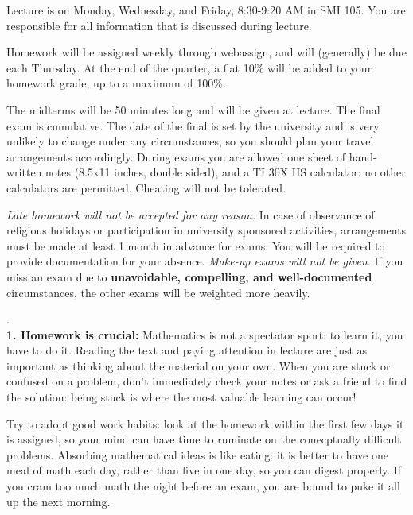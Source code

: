\documentclass[11 pt]{report}
\begin{document}
\vspace{0.25cm}

  Lecture is on Monday, Wednesday, and Friday, 8:30-9:20 AM in SMI 105.  You
are responsible for all information that is discussed
during lecture. 
\vspace{0.25cm}

  Homework will be assigned weekly through webassign, and will (generally) be due each Thursday. At the end of the quarter, a flat 10\% will be added to your homework grade, up to a maximum of 100\%. 
\vspace{0.25cm}


  The midterms will be 50 minutes long and
will be given at lecture.  The final exam is cumulative. The date of the final is set by the university and is very unlikely to change under any circumstances, so you should plan your travel arrangements accordingly. During exams you are allowed one 
sheet of hand-written notes (8.5x11 inches, double sided), and a TI 30X IIS calculator: no other calculators are permitted. 
Cheating will not be tolerated. 

\vspace{.25cm}

  \emph{Late homework will not be accepted
for any reason.}  In case of observance of religious holidays or
participation in university sponsored activities, arrangements must
be made at least 1 month in advance for exams. You will be required
to provide documentation for your absence. \emph{Make-up exams will
not be given}.  If you miss an exam due to {\bf unavoidable,
compelling, and well-documented} circumstances, the other exams will
be weighted more heavily. \vspace{0.25cm}

\newpage 

. \\
{\bf1.  Homework is crucial:} Mathematics is not a spectator sport: to learn it, you have to do it.
Reading the text and paying attention in lecture are just as important as thinking about
the material on your own. When you are stuck or confused on a problem, don't immediately check your notes or 
ask a friend to find the solution: being stuck is where the most valuable learning can occur! 

\vspace{.2cm}

\noindent Try to adopt good work habits: look at
the homework within the first few days it is assigned, so your mind can have time to ruminate on the conecptually difficult problems.
Absorbing mathematical ideas is like eating: it is better to have one meal of math each day, rather than five in one day, so you can digest properly. If you cram too much math the night before an exam, you are bound to puke it all up the next morning.  
\end{document}
